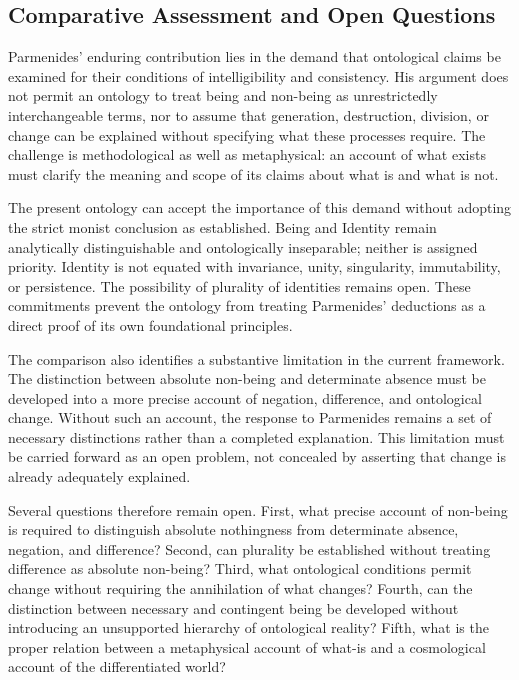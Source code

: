 
\subsection{Comparative Assessment and Open Questions}


Parmenides' enduring contribution lies
in the demand that ontological claims
be examined for their conditions of
intelligibility and consistency. His
argument does not permit an ontology
to treat being and non-being as
unrestrictedly interchangeable terms,
nor to assume that generation,
destruction, division, or change
can be explained without specifying
what these processes require. The
challenge is methodological as
well as metaphysical: an account
of what exists must clarify the
meaning and scope of its claims
about what is and what is not.


The present ontology can accept the
importance of this demand without
adopting the strict monist conclusion
as established. Being and Identity
remain analytically distinguishable
and ontologically inseparable;
neither is assigned priority.
Identity is not equated with
invariance, unity, singularity,
immutability, or persistence.
The possibility of plurality of
identities remains open. These
commitments prevent the ontology
from treating Parmenides' deductions
as a direct proof of its own
foundational principles.


The comparison also identifies a
substantive limitation in the
current framework. The distinction
between absolute non-being and
determinate absence must be
developed into a more precise
account of negation, difference,
and ontological change. Without
such an account, the response
to Parmenides remains a set
of necessary distinctions
rather than a completed
explanation. This limitation
must be carried forward as
an open problem, not concealed
by asserting that change is
already adequately explained.


Several questions therefore remain
open. First, what precise account
of non-being is required to
distinguish absolute nothingness
from determinate absence,
negation, and difference?
Second, can plurality be
established without treating
difference as absolute
non-being? Third, what
ontological conditions permit
change without requiring the
annihilation of what changes?
Fourth, can the distinction
between necessary and contingent
being be developed without
introducing an unsupported
hierarchy of ontological
reality? Fifth, what is the
proper relation between a
metaphysical account of what-is
and a cosmological account of
the differentiated world?

